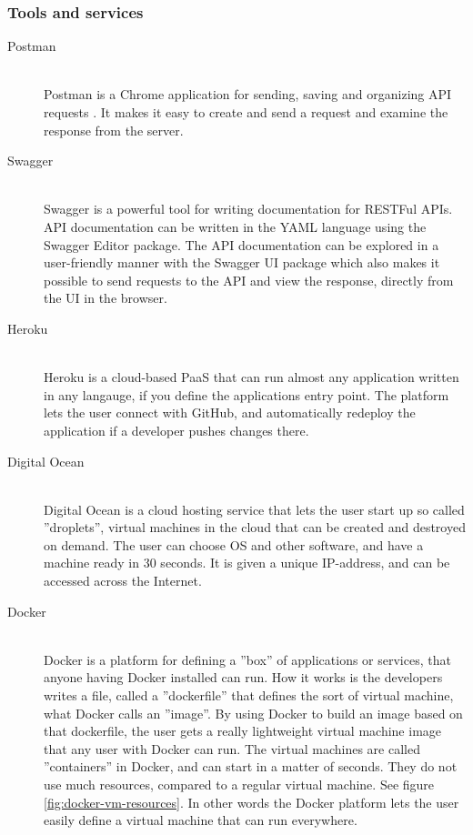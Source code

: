 \subsubsection{Tools and services}
\begin{description}
    \item[Postman] \hfill \\
        Postman is a Chrome application for sending, saving and organizing API requests \cite{postman}. It makes it easy to create and send a request and examine the response from the server. 
    \item[Swagger] \hfill \\
        Swagger \cite{swagger} is a powerful tool for writing documentation for RESTFul APIs. API documentation can be written in the \gls{YAML} language using the Swagger Editor package. \cite{swagger-editor}The \gls{API} documentation can be explored in a user-friendly manner with the Swagger UI package which also makes it possible to send requests to the API and view the response, directly from the UI in the browser. \cite{swagger-ui}
    \item[Heroku] \hfill \\
        Heroku is a cloud-based PaaS \cite[p. 849]{progark} that can run almost any application written in any langauge, if you define the applications entry point. \cite{heroku} The platform lets the user connect with GitHub, and automatically redeploy the application if a developer pushes changes there. 
    \item[Digital Ocean] \hfill \\
        \label{prelim-digitalocean}
        Digital Ocean is a cloud hosting service that lets the user start up so called ''droplets'', virtual machines in the cloud that can be created and destroyed on demand. \cite{digitalocean} The user can choose \gls{OS} and other software, and have a machine ready in 30 seconds.  It is given a unique \gls{IP}-address, and can be accessed across the Internet.
    \item[Docker] \hfill \\
        \label{prelim-docker}
        Docker is a platform for defining a ''box'' of applications or services, that anyone having Docker installed can run. \cite{docker} How it works is the developers writes a file, called a ''dockerfile'' that defines the sort of virtual machine, what Docker calls an ''image''. By using Docker to build an image based on that dockerfile, the user gets a really lightweight virtual machine image that any user with Docker can run. The virtual machines are called ''containers'' in Docker, and can start in a matter of seconds. They do not use much resources, compared to a regular virtual machine. \cite{docker-what-is} See figure \ref{fig:docker-vm-resources}. In other words the Docker platform lets the user easily define a virtual machine that can run everywhere. 

\end{description}
